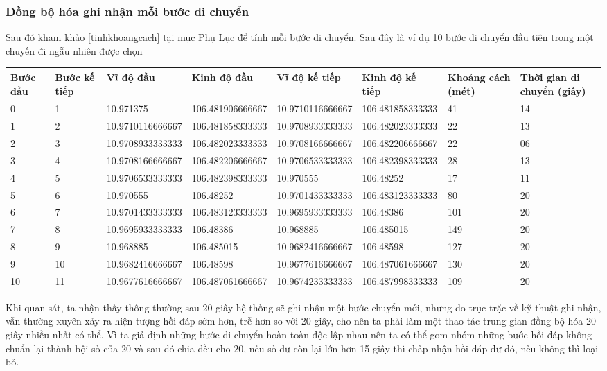 \documentclass[a4paper, 13pt]{report}
\begin{document}
\subsubsection{Đồng bộ hóa ghi nhận mỗi bước di chuyển}
Sau đó kham khảo \ref{tinhkhoangcach} tại mục Phụ Lục để tính mỗi bước di chuyển. Sau đây là ví dụ 10 bước di chuyển đầu tiên trong một chuyến đi ngẫu nhiên được chọn\\
\begin{flushleft}
\begin{tabular}{|p{1cm}|p{1cm}|p{2.6cm}|p{2.6cm}|p{2.6cm}|p{2.6cm}|p{1cm}|p{1cm}| }
\hline
Bước đầu & Bước kế tiếp & Vĩ độ đầu & Kinh độ đầu & Vĩ độ kế tiếp & Kinh độ kế tiếp & Khoảng cách (mét) & Thời gian di chuyển (giây) \\ 
\hline
0 & 1 & 10.971375 & 106.481906666667 & 10.9710116666667 & 106.481858333333 & 41 & 14 \\
\hline
1 & 2 & 10.9710116666667 & 106.481858333333 & 10.9708933333333 & 106.482023333333 & 22 & 13 \\
\hline
2 & 3 & 10.9708933333333 & 106.482023333333 & 10.9708166666667 & 106.482206666667 & 22 & 06 \\
\hline
3 & 4 & 10.9708166666667 & 106.482206666667 & 10.9706533333333 & 106.482398333333 & 28 & 13 \\
\hline
4 & 5 & 10.9706533333333 & 106.482398333333 & 10.970555 & 106.48252 & 17 & 11 \\
\hline
5 & 6 & 10.970555 & 106.48252 & 10.9701433333333 & 106.483123333333 & 80 & 20 \\
\hline
6 & 7 & 10.9701433333333 & 106.483123333333 & 10.9695933333333 & 106.48386 & 101 & 20 \\
\hline
7 & 8 & 10.9695933333333 & 106.48386 & 10.968885 & 106.485015 & 149 & 20 \\
\hline
8 & 9 & 10.968885 & 106.485015 & 10.9682416666667 & 106.48598 & 127 & 20 \\
\hline
9 & 10 & 10.9682416666667 & 106.48598 & 10.9677616666667 & 106.487061666667 & 130 & 20 \\
\hline
10 & 11 & 10.9677616666667 & 106.487061666667 & 10.9674233333333 & 106.487998333333 & 109 & 20 \\
\hline 
\end{tabular}
\end{flushleft}
Khi quan sát, ta nhận thấy thông thường sau 20 giây hệ thống sẽ ghi nhận một bước chuyển mới, nhưng do trục trặc về kỹ thuật ghi nhận, vẫn thường xuyên xảy ra hiện tượng hồi đáp sớm hơn, trễ hơn so với 20 giây, cho nên ta phải làm một thao tác trung gian đồng bộ hóa 20 giây nhiều nhất có thể. Vì ta giả định những bước di chuyển hoàn toàn độc lập nhau nên ta có thể gom nhóm những bước hồi đáp không chuẩn lại thành bội số của 20 và sau đó chia đều cho 20, nếu số dư còn lại lớn hơn 15 giây thì chấp nhận hồi đáp dư đó, nếu không thì loại bỏ.\\      
\end{document}
